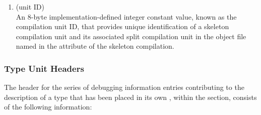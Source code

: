 \begin{enumerate}[1. ]
\item \HFNdwoid{} (unit ID) \\
An 8-byte implementation-defined integer constant value, 
known as the compilation unit ID, that provides 
unique identification of a skeleton compilation 
unit and its associated split compilation unit in 
the object file named in the \DWATdwoname{} attribute
of the skeleton compilation.

\end{enumerate}

\subsubsection{Type Unit Headers}
\label{datarep:typeunitheaders}
The header for the series of debugging information entries
contributing to the description of a type that has been
placed in its own , within the 
\dotdebuginfo{} section,
consists of the following information:
